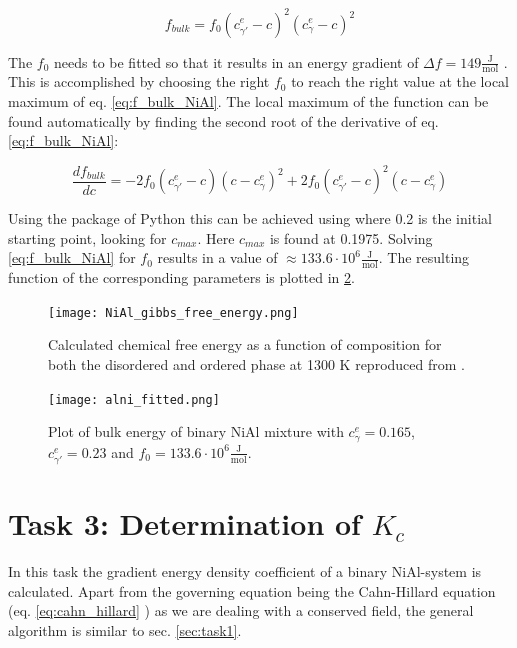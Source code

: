 \begin{equation}
	f_{bulk} = f_{0} (c_{\gamma '}^{e} - c)^{2}(c_{\gamma}^{e} - c)^{2} \label{eq:f_bulk_NiAl}
\end{equation}

The \( f_{0}\) needs to be fitted so that it results in an energy gradient of \(\Delta f = 149 \frac{\mathrm{J}}{\mathrm{mol}} \) \cite{zaisera}. This is accomplished by choosing the right \(f_{0}\) to reach the right value at the local maximum of eq. \ref{eq:f_bulk_NiAl}. The local maximum of the function can be found automatically by finding the second root of the derivative of eq. \ref{eq:f_bulk_NiAl}:

\begin{equation}
	\frac{df_{bulk}}{dc} = -2 f_{0} (c_{\gamma '}^{e} - c)(c - c_{\gamma}^{e})^{2} + 2 f_{0} (c_{\gamma '}^{e} - c)^{2}(c - c_{\gamma}^{e})
\end{equation}

Using the  package of Python this can be achieved using  where 0.2 is the initial starting point, looking for \(c_{max}\). Here \(c_{max}\) is found at 0.1975. Solving \ref{eq:f_bulk_NiAl} for \(f_{0}\) results in a value of \(\approx 133.6 \cdot 10^{6} \frac{\mathrm{J}}{\mathrm{mol}}\).  The resulting function of the corresponding parameters is plotted in \ref{fig:alni_fitted}.


\begin{figure}[htb]
	\centering\texttt{[image: NiAl\_gibbs\_free\_energy.png]}
	\caption{Calculated chemical free energy as a function of composition for both the disordered and ordered phase at 1300 K reproduced from \cite{zhu2002}.}
	\label{fig:AlNi_gibbs}
\end{figure}

\begin{figure}[htb]
	\centering
	\texttt{[image: alni\_fitted.png]}
	\caption{Plot of bulk energy of binary NiAl mixture with \(c_{\gamma}^{e} = 0.165\),  \(c_{\gamma '}^{e} = 0.23\) and \(f_{0} = 133.6 \cdot 10^{6} \frac{\mathrm{J}}{\mathrm{mol}} \).}
	\label{fig:alni_fitted}
\end{figure}

\section{Task 3: Determination of \(K_{c}\) }
In this task the gradient energy density coefficient of a binary NiAl-system is calculated. Apart from the governing equation being the Cahn-Hillard equation (eq. \ref{eq:cahn_hillard} ) as we are dealing with a conserved field, the general algorithm is similar to sec. \ref{sec:task1}. 

